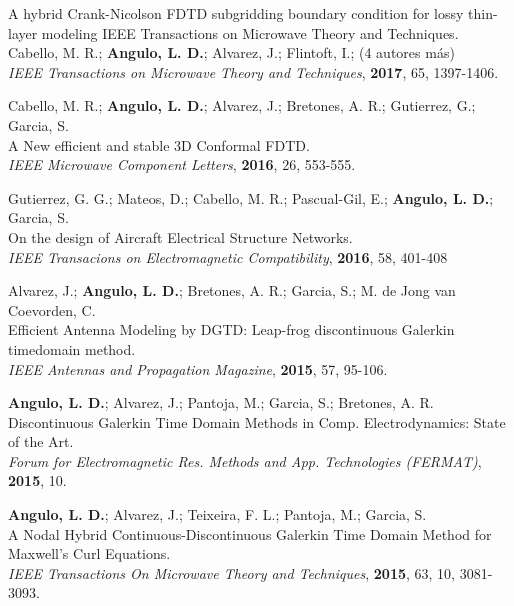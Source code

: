\documentclass[margin,line]{res}
\begin{document}
\begin{minipage}{\textwidth}
	A hybrid Crank-Nicolson FDTD subgridding boundary condition for lossy thin-layer modeling IEEE Transactions on Microwave Theory and Techniques.\\
	Cabello, M. R.; \textbf{Angulo, L. D.}; Alvarez, J.; Flintoft, I.; (4 autores más)\\
	{\it IEEE Transactions on Microwave Theory and Techniques}, {\bf 2017}, 65, 1397-1406.
\end{minipage}

\begin{minipage}{\textwidth}
	Cabello, M. R.; \textbf{Angulo, L. D.}; Alvarez, J.; Bretones, A. R.; Gutierrez, G.; Garcia, S.\\
	A New efficient and stable 3D Conformal FDTD.\\
	{\it IEEE Microwave Component Letters}, {\bf 2016}, 26, 553-555.
\end{minipage}

\begin{minipage}{\textwidth}
	Gutierrez, G. G.; Mateos, D.; Cabello, M. R.; Pascual-Gil, E.; \textbf{Angulo, L. D.}; Garcia, S.\\
	On the design of Aircraft Electrical Structure Networks.\\
	\textit{IEEE Transacions on Electromagnetic Compatibility}, \textbf{2016}, 58, 401-408
\end{minipage}

Alvarez, J.; {\bf Angulo, L. D.}; Bretones, A. R.; Garcia, S.; M. de Jong van Coevorden, C.\\
Efficient Antenna Modeling by DGTD: Leap-frog discontinuous Galerkin timedomain method. \\
{\it IEEE Antennas and Propagation Magazine}, {\bf 2015}, 57, 95-106.

{\bf Angulo, L. D.}; Alvarez, J.; Pantoja, M.; Garcia, S.; Bretones, A. R.\\
Discontinuous Galerkin Time Domain Methods in Comp. Electrodynamics: State of the Art.\\
{\it Forum for Electromagnetic Res. Methods and App. Technologies (FERMAT)}, {\bf 2015}, 10.

{\bf Angulo, L. D.}; Alvarez, J.; Teixeira, F. L.; Pantoja, M.; Garcia, S.\\
A Nodal Hybrid Continuous-Discontinuous Galerkin Time Domain Method for Maxwell's Curl Equations.\\
{\it IEEE Transactions On Microwave Theory and Techniques}, {\bf 2015}, 63, 10, 3081-3093.
\end{document}

